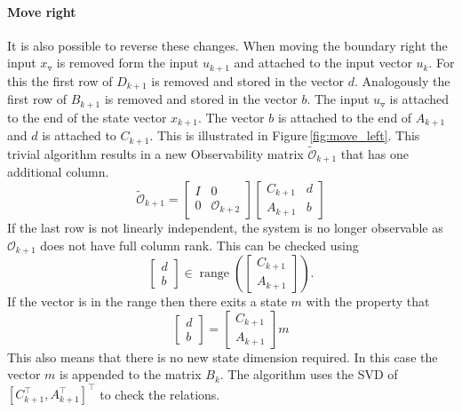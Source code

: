 \documentclass[doctype=mastersthesis,BCOR=15mm,biblatex]{ldvbook}%
\DeclareMathOperator{\range}{range}
\newcommand{\Ob}{\mathcal{O}} %
\newcommand{\eye}{I} %
\newcommand{\m}{\triangledown} %
\begin{document}
\paragraph{Move right}
It is also possible to reverse these changes.
When moving the boundary right the input $x_\m$ is removed form the input $u_{k+1}$ and attached to the input vector $u_k$.
For this the first row of $D_{k+1}$ is removed and stored in the vector $d$. Analogously the first row of $B_{k+1}$ is removed and stored in the vector $b$.
The input $u_\m$ is attached to the end of the state vector $x_{k+1}$.
The vector $b$ is attached to the end of $A_{k+1}$ and $d$ is attached to $C_{k+1}$.
This is illustrated in Figure\,\ref{fig:move_left}.
This trivial algorithm results in a new Observability matrix $\tilde{\Ob}_{k+1}$ that has one additional column.
\begin{equation}
	\tilde{\Ob}_{k+1}
	=
	\begin{bmatrix}
	\eye & 0\\ 0 &\Ob_{k+2}
	\end{bmatrix}
	\begin{bmatrix}
	C_{k+1} & d\\
	A_{k+1} & b
	\end{bmatrix}
\end{equation}
If the last row is not linearly independent, the system is no longer observable as $\Ob_{k+1}$ does not have full column rank.
This can be checked using
\begin{equation}
	\begin{bmatrix}
	d\\b
	\end{bmatrix}
	\in
	\range\left(
	\begin{bmatrix}
	C_{k+1}\\A_{k+1}
	\end{bmatrix}\right).
\end{equation}
If the vector is in the range then there exits a state $m$ with the property that
\begin{equation}
	\begin{bmatrix}
	d\\b
	\end{bmatrix}
	=
	\begin{bmatrix}
	C_{k+1}\\A_{k+1}
	\end{bmatrix}
	m
\end{equation}
This also means that there is no new state dimension required.
In this case the vector $m$ is appended to the matrix $B_{k}$.
The algorithm uses the SVD of $[C_{k+1}^\top,A_{k+1}^\top]^\top$ to check the relations.
\end{document}
